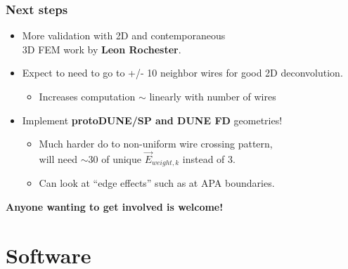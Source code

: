 \documentclass[xcolor=dvipsnames]{beamer}
\begin{document}
\begin{frame}
  \frametitle{Next steps}

  \begin{itemize}
  \item More validation with 2D and contemporaneous \\
    3D FEM work by \textbf{Leon Rochester}.
  \item Expect to need to go to +/- 10 neighbor wires for good 2D deconvolution.
    \begin{itemize}
    \item Increases computation $\sim$ linearly with number of wires
    \end{itemize}
  \item Implement \textbf{protoDUNE/SP and DUNE FD} geometries!
    \begin{itemize}
    \item Much harder do to non-uniform wire crossing pattern, \\
      will need $\sim$30 of unique $\vec{E}_{weight,k}$ instead of 3.
    \item Can look at ``edge effects'' such as at APA boundaries.
    \end{itemize}
  \end{itemize}


  \vfill

  \textbf{Anyone wanting to get involved is welcome!}
\end{frame}

\section{Software}
\end{document}
